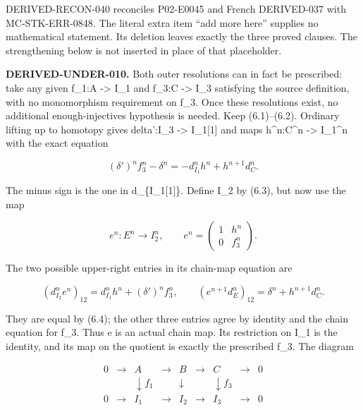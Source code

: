 DERIVED-RECON-040 reconciles P02-E0045 and French DERIVED-037 with MC-STK-ERR-0848. The literal extra item ``add more here'' supplies no mathematical statement. Its deletion leaves exactly the three proved clauses. The strengthening below is not inserted in place of that placeholder.

\textbf{DERIVED-UNDER-010.} Both outer resolutions can in fact be prescribed:\allowbreak{} take any given f\_\allowbreak{}1:\allowbreak{}A \allowbreak{}-> I\_\allowbreak{}1 and f\_\allowbreak{}3:\allowbreak{}C \allowbreak{}-> I\_\allowbreak{}3 satisfying the source definition,\allowbreak{} with no monomorphism requirement on f\_\allowbreak{}3. Once these resolutions exist,\allowbreak{} no additional enough-injectives hypothesis is needed. Keep (6.1)\allowbreak{}–\allowbreak{}(6.2)\allowbreak{}. Ordinary lifting up to homotopy gives delta':\allowbreak{}I\_\allowbreak{}3 \allowbreak{}-> I\_\allowbreak{}1[1]\allowbreak{} and maps h\textasciicircum{}n:\allowbreak{}C\textasciicircum{}n \allowbreak{}-> I\_\allowbreak{}1\textasciicircum{}n with the exact equation

\[
 (\delta')^n f_3^n-\delta^n
       =-d_{I_1}^n h^n+h^{n+1}d_C^n.                    \tag{6.4}
\]

The minus sign is the one in d\_\allowbreak{}\{I\_\allowbreak{}1[1]\allowbreak{}\}. Define I\_\allowbreak{}2 by (6.3)\allowbreak{},\allowbreak{} but now use the map

\[
 e^n:E^n\longrightarrow I_2^n,\qquad
 e^n=\begin{pmatrix}1&h^n\\0&f_3^n\end{pmatrix}.          \tag{6.5}
\]

The two possible upper-right entries in its chain-map equation are

\[
 (d_{I_2}^n e^n)_{12}=d_{I_1}^n h^n+(\delta')^n f_3^n,\qquad
 (e^{n+1}d_E^n)_{12}=\delta^n+h^{n+1}d_C^n.
\]

They are equal by (6.4)\allowbreak{}; the other three entries agree by identity and the chain equation for f\_\allowbreak{}3. Thus e is an actual chain map. Its restriction on I\_\allowbreak{}1 is the identity,\allowbreak{} and its map on the quotient is exactly the prescribed f\_\allowbreak{}3. The diagram

\[
\begin{array}{ccccccccc}
0&\longrightarrow&A&\longrightarrow&B&\longrightarrow&C&\longrightarrow&0\\
&&\downarrow f_1&&\downarrow&&\downarrow f_3&&\\
0&\longrightarrow&I_1&\longrightarrow&I_2&\longrightarrow&I_3&\longrightarrow&0
\end{array}                                                    \tag{6.6}
\]


